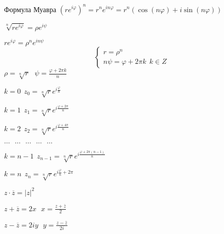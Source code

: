\begin{block}
  Формула Муавра
  $(r e^{i\varphi})^n = r^n e^{in\varphi} = r^n(\cos(n\varphi) +
  i\sin(n\varphi))$

  $\sqrt[n]{re^{i\varphi}} = \rho e^{i\psi}$

  $re^{i\varphi} = \rho^n e^{in\psi}$
  $$
  \left\{
  \begin{array}{l}
    r = \rho^n \\
    n\psi = \varphi + 2\pi k ~~ k \in Z
  \end{array}
  \right.
  $$
  $\rho = \sqrt[n]{r} ~~~ \psi = \frac{\varphi + 2\pi k}{n}$

  $k = 0 ~~ z_0 = \sqrt[n]{r} e^{i\frac{\varphi}{n}}$

  $k = 1 ~~ z_1 = \sqrt[n]{r} e^{i\frac{\varphi + 2\pi}{n}}$

  $k = 2 ~~ z_2 = \sqrt[n]{r} e^{i\frac{\varphi + 4\pi}{n}}$

  $\ldots ~~~ \ldots ~~~ \ldots ~~~ \ldots ~~~ \ldots$

  $k = n-1 ~~ z_{n-1} = \sqrt[n]{r} e^{i\frac{\varphi + 2\pi(n-1)}{n}}$

  $k = n ~~ z_n = \sqrt[n]{r} e^{i\frac{\varphi}{n} + 2\pi}$

  $z \cdot \overline{z} = |z|^2$

  $z + \overline{z} = 2x ~~~ x = \frac{z + \overline{z}}{2}$

  $z - \overline{z} = 2iy ~~~ y = \frac{z - \overline{z}}{2i}$
\end{block}
